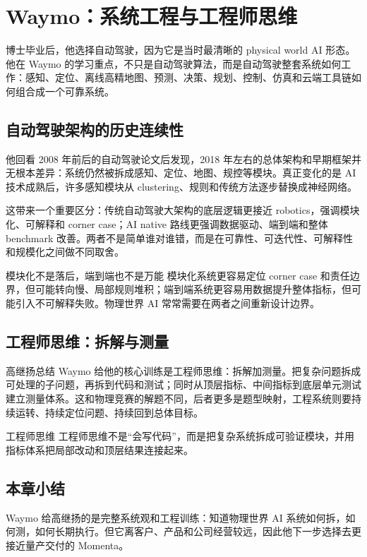 \section{Waymo：系统工程与工程师思维}

博士毕业后，他选择自动驾驶，因为它是当时最清晰的 physical world AI 形态。他在 Waymo 的学习重点，不只是自动驾驶算法，而是自动驾驶整套系统如何工作：感知、定位、离线高精地图、预测、决策、规划、控制、仿真和云端工具链如何组合成一个可靠系统。

\subsection{自动驾驶架构的历史连续性}

他回看 2008 年前后的自动驾驶论文后发现，2018 年左右的总体架构和早期框架并无根本差异：系统仍然被拆成感知、定位、地图、规控等模块。真正变化的是 AI 技术成熟后，许多感知模块从 clustering、规则和传统方法逐步替换成神经网络。

这带来一个重要区分：传统自动驾驶大架构的底层逻辑更接近 robotics，强调模块化、可解释和 corner case；AI native 路线更强调数据驱动、端到端和整体 benchmark 改善。两者不是简单谁对谁错，而是在可靠性、可迭代性、可解释性和规模化之间做不同取舍。

\begin{warningbox}{模块化不是落后，端到端也不是万能}
模块化系统更容易定位 corner case 和责任边界，但可能转向慢、局部规则堆积；端到端系统更容易用数据提升整体指标，但可能引入不可解释失败。物理世界 AI 常常需要在两者之间重新设计边界。
\end{warningbox}

\subsection{工程师思维：拆解与测量}

高继扬总结 Waymo 给他的核心训练是工程师思维：拆解加测量。把复杂问题拆成可处理的子问题，再拆到代码和测试；同时从顶层指标、中间指标到底层单元测试建立测量体系。这和物理竞赛的解题不同，后者更多是题型映射，工程系统则要持续运转、持续定位问题、持续回到总体目标。

\begin{importantbox}{工程师思维}
工程师思维不是“会写代码”，而是把复杂系统拆成可验证模块，并用指标体系把局部改动和顶层结果连接起来。
\end{importantbox}

\subsection{本章小结}

Waymo 给高继扬的是完整系统观和工程训练：知道物理世界 AI 系统如何拆，如何测，如何长期执行。但它离客户、产品和公司经营较远，因此他下一步选择去更接近量产交付的 Momenta。

